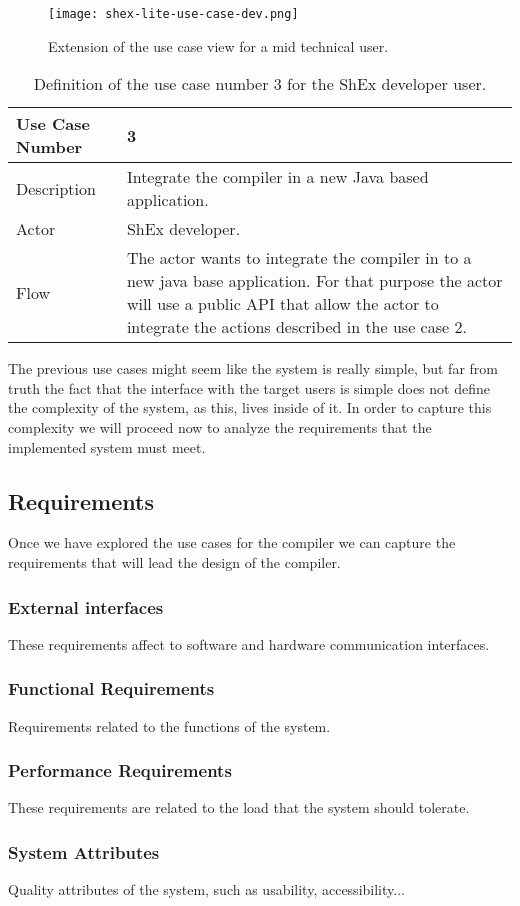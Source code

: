\begin{figure}[hb]
    \texttt{[image: shex-lite-use-case-dev.png]}
    \caption[Extension of the use case view for a mid technical user]{Extension of the use case view for a 
    mid technical user.}
\end{figure}

\begin{table}
    \begin{tabular}{ | m{2cm} | m{8cm}| }
        \toprule
        Use Case Number & 3 \\
        \midrule
        Description & Integrate the compiler in a new Java based application. \\
        \midrule
        Actor & ShEx developer. \\
        \midrule
        Flow & The actor wants to integrate the compiler in to a new java base application. For that purpose 
        the actor will use a public API that allow the actor to integrate the actions described in the use case 
        2. \\
        \bottomrule
    \end{tabular}
    \caption[Definition of the use case number 3 for the ShEx developer user]{Definition of the use case number 
    3 for the ShEx developer user.}
\end{table}

\bigskip
The previous use cases might seem like the system is really simple, but far from truth the
fact that the interface with the target users is simple does not define the complexity of the
system, as this, lives inside of it. In order to capture this complexity we will proceed now to
analyze the requirements that the implemented system must meet. 

\subsection{Requirements}
Once we have explored the use cases for the compiler we can capture the requirements that will lead
the design of the compiler.

\subsubsection{External interfaces}
These requirements affect to software and hardware communication interfaces.

\subsubsection{Functional Requirements}
Requirements related to the functions of the system.

\subsubsection{Performance Requirements}
These requirements are related to the load that the system should tolerate.

\subsubsection{System Attributes}
Quality attributes of the system, such as usability, accessibility...
